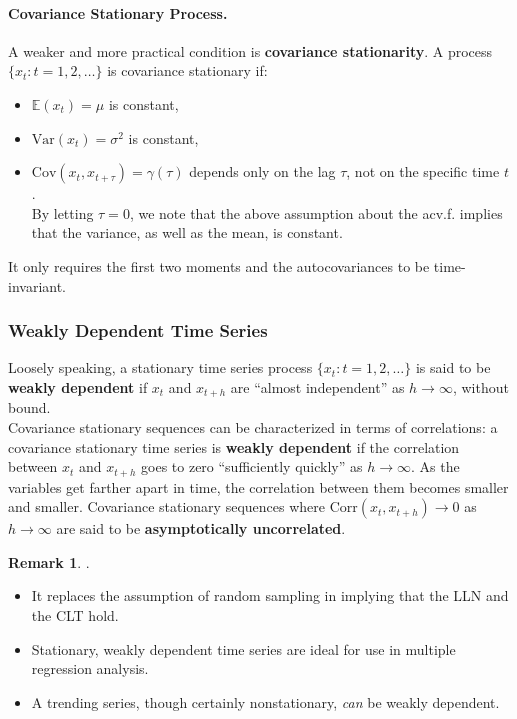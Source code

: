 \documentclass[a4paper, 10pt]{article}
\theoremstyle{definition}	%
\newtheorem*{remark}{Remark}
\begin{document}
\paragraph{Covariance Stationary Process.}
A weaker and more practical condition is \textbf{covariance stationarity}. A process \( \{x_t: t = 1, 2, \dots \} \) is covariance stationary if:
\begin{itemize}
    \item \( \mathbb{E}(x_t) = \mu \) is constant,
    \item \( \text{Var}(x_t) = \sigma^2 \) is constant,
    \item \( \text{Cov}(x_t, x_{t+\tau})  = \gamma(\tau)\) depends only on the lag \( \tau \), not on the specific time \( t \).\\
    By letting $\tau =0$, we note that the above assumption about the acv.f. implies that the variance, as well as the mean, is constant. 
\end{itemize}
It only requires the first two moments and the autocovariances to be time-invariant.

\subsubsection{Weakly Dependent Time Series}
Loosely speaking, a stationary time series process \( \{x_t : t = 1, 2, \ldots\} \) is said to be \textbf{weakly dependent} if \( x_t \) and \( x_{t+h} \) are ``almost independent'' as \( h \to \infty \), without bound.\\
Covariance stationary sequences can be characterized in terms of correlations: a covariance stationary time series is \textbf{weakly dependent} if the correlation between \( x_t \) and \( x_{t+h} \) goes to zero ``sufficiently quickly'' as \( h \to \infty \). As the variables get farther apart in time, the correlation between them becomes smaller and smaller. Covariance stationary sequences where \( \text{Corr}(x_t, x_{t+h}) \to 0 \) as \( h \to \infty \) are said to be \textbf{asymptotically uncorrelated}.
\begin{remark}.
    \begin{itemize}
        \item It replaces the assumption of random sampling in implying that the LLN and the CLT hold.
        \item Stationary, weakly dependent time series are ideal for use in multiple regression analysis.
        \item A trending series, though certainly nonstationary, \textit{can} be weakly dependent.
    \end{itemize}
\end{remark}
\end{document}
